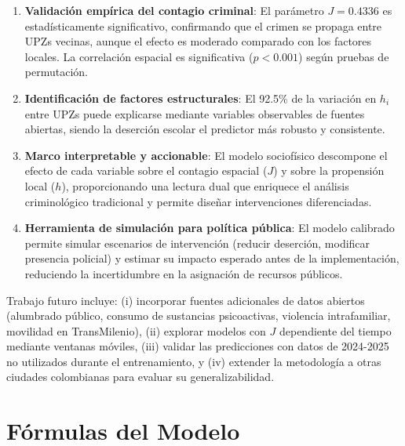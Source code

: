 \documentclass[12pt,a4paper]{article}
\begin{document}
\begin{enumerate}[label=\alph*)]
    \item \textbf{Validación empírica del contagio criminal}: El parámetro $J = 0.4336$ es estadísticamente significativo, confirmando que el crimen se propaga entre UPZs vecinas, aunque el efecto es moderado comparado con los factores locales. La correlación espacial es significativa ($p < 0.001$) según pruebas de permutación.
    
    \item \textbf{Identificación de factores estructurales}: El 92.5\% de la variación en $h_i$ entre UPZs puede explicarse mediante variables observables de fuentes abiertas, siendo la deserción escolar el predictor más robusto y consistente.
    
    \item \textbf{Marco interpretable y accionable}: El modelo sociofísico descompone el efecto de cada variable sobre el contagio espacial ($J$) y sobre la propensión local ($h$), proporcionando una lectura dual que enriquece el análisis criminológico tradicional y permite diseñar intervenciones diferenciadas.
    
    \item \textbf{Herramienta de simulación para política pública}: El modelo calibrado permite simular escenarios de intervención (reducir deserción, modificar presencia policial) y estimar su impacto esperado antes de la implementación, reduciendo la incertidumbre en la asignación de recursos públicos.
\end{enumerate}

Trabajo futuro incluye: (i) incorporar fuentes adicionales de datos abiertos (alumbrado público, consumo de sustancias psicoactivas, violencia intrafamiliar, movilidad en TransMilenio), (ii) explorar modelos con $J$ dependiente del tiempo mediante ventanas móviles, (iii) validar las predicciones con datos de 2024-2025 no utilizados durante el entrenamiento, y (iv) extender la metodología a otras ciudades colombianas para evaluar su generalizabilidad.

\newpage
\nocite{*}
\printbibliography[title={Bibliografía}]


\newpage
\appendix
\section{Fórmulas del Modelo}
\end{document}
